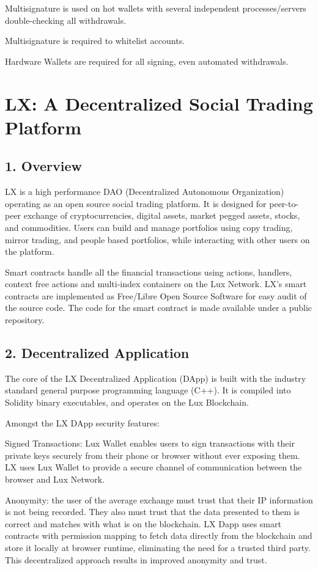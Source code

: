 \documentclass[11pt]{article}
\begin{document}
Multisignature is used on hot wallets with several independent processes/servers double-checking all withdrawals.


Multisignature is required to whitelist accounts.


Hardware Wallets are required for all signing, even automated withdrawals.


\section{LX: A Decentralized Social Trading Platform}

\subsection{1. Overview}

LX is a high performance DAO (Decentralized Autonomous Organization) operating as an open source social trading platform. It is designed for peer-to-peer exchange of cryptocurrencies, digital assets, market pegged assets, stocks, and commodities. Users can build and manage portfolios using copy trading, mirror trading, and people based portfolios, while interacting with other users on the platform.


Smart contracts handle all the financial transactions using actions, handlers, context free actions and multi-index containers on the Lux Network. LX's smart contracts are implemented as Free/Libre Open Source Software for easy audit of the source code. The code for the smart contract is made available under a public repository.


\subsection{2. Decentralized Application}

The core of the LX Decentralized Application (DApp) is built with the industry standard general purpose programming language (C++). It is compiled into Solidity binary executables, and operates on the Lux  Blockchain.


Amongst the LX DApp security features:


Signed Transactions: Lux Wallet enables users to sign transactions with their private keys securely from their phone or browser without ever exposing them. LX uses Lux Wallet to provide a secure channel of communication between the browser and Lux Network.


Anonymity: the user of the average exchange must trust that their IP information is not being recorded. They also must trust that the data presented to them is correct and matches with what is on the blockchain. LX Dapp uses smart contracts with permission mapping to fetch data directly from the blockchain and store it locally at browser runtime, eliminating the need for a trusted third party. This decentralized approach results in improved anonymity and trust.
\end{document}

